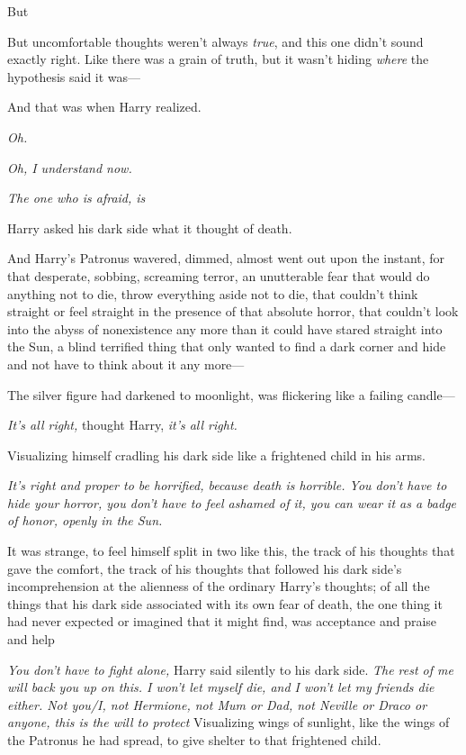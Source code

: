 But{\el}

But uncomfortable thoughts weren't always \emph{true}, and this one didn't
sound exactly right. Like there was a grain of truth, but it wasn't hiding
\emph{where} the hypothesis said it was---

And that was when Harry realized.

\emph{Oh.}

\emph{Oh, I understand now.}

\emph{The one who is afraid, is{\el}}

Harry asked his dark side what it thought of death.

And Harry's Patronus wavered, dimmed, almost went out upon the instant, for
that desperate, sobbing, screaming terror, an unutterable fear that would do
anything not to die, throw everything aside not to die, that couldn't think
straight or feel straight in the presence of that absolute horror, that
couldn't look into the abyss of nonexistence any more than it could have stared
straight into the Sun, a blind terrified thing that only wanted to find a dark
corner and hide and not have to think about it any more---

The silver figure had darkened to moonlight, was flickering like a failing
candle---

\emph{It's all right,} thought Harry, \emph{it's all right.}

Visualizing himself cradling his dark side like a frightened child in his arms.

\emph{It's right and proper to be horrified, because death is horrible. You
don't have to hide your horror, you don't have to feel ashamed of it, you can
wear it as a badge of honor, openly in the Sun.}

It was strange, to feel himself split in two like this, the track of his
thoughts that gave the comfort, the track of his thoughts that followed his
dark side's incomprehension at the alienness of the ordinary Harry's thoughts;
of all the things that his dark side associated with its own fear of death, the
one thing it had never expected or imagined that it might find, was acceptance
and praise and help{\el}

\emph{You don't have to fight alone,} Harry said silently to his dark side.
\emph{The rest of me will back you up on this. I won't let myself die, and I
won't let my friends die either. Not you/I, not Hermione, not Mum or Dad, not
Neville or Draco or anyone, this is the will to protect{\el}} Visualizing
wings of sunlight, like the wings of the Patronus he had spread, to give
shelter to that frightened child.

